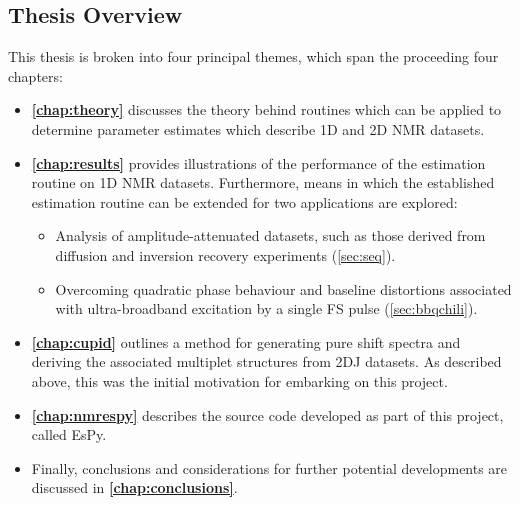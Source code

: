 \subsection{Thesis Overview}
This thesis is broken into four principal themes, which span the proceeding
four chapters:
\begin{itemize}
    \item \textbf{\cref{chap:theory}} discusses the theory behind routines
        which can be applied to determine parameter estimates which describe
        \ac{1D} and \ac{2D} \ac{NMR} datasets.
    \item \textbf{\cref{chap:results}} provides illustrations of the
        performance of the estimation routine on \ac{1D} \ac{NMR} datasets.
        Furthermore, means in which the established estimation routine can be
        extended for two applications are explored:
        \begin{itemize}
            \item Analysis of amplitude-attenuated datasets, such as those
                derived from diffusion and inversion recovery experiments
                (\cref{sec:seq}).
            \item Overcoming quadratic phase behaviour and baseline distortions
                associated with ultra-broadband excitation by a single
                \acl{FS} pulse (\cref{sec:bbqchili}).
        \end{itemize}
    \item \textbf{\cref{chap:cupid}} outlines a method for generating pure
        shift spectra and deriving the associated multiplet structures from
        \ac{2DJ} datasets. As described above, this was the initial motivation
        for embarking on this project.
    \item \textbf{\cref{chap:nmrespy}} describes the source code developed as
        part of this project, called \acs{EsPy}.
    \item Finally, conclusions and considerations for further potential
        developments are discussed in \textbf{\cref{chap:conclusions}}.
\end{itemize}

